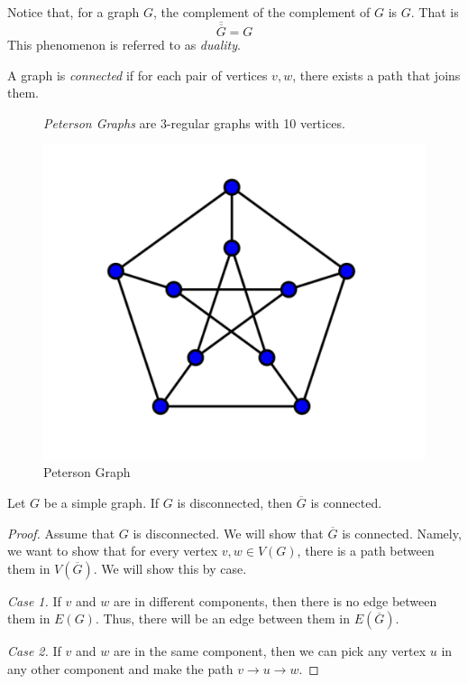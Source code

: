 \begin{remark}[Duality]
  Notice that, for a graph \(G\), the complement of the complement of \(G\) is
  \(G\). That is 
  \[ \overline{\overline{G}} = G \]
  This phenomenon is referred to as \textit{duality}.
\end{remark}

\begin{definition}
  A graph is \textit{connected} if for each pair of vertices \(v, w\), there
  exists a path that joins them.
\end{definition}

\begin{figure}[ht]
\begin{nexample}
    \textit{Peterson Graphs} are \(3\)-regular graphs with 10 vertices.
   
  \begin{center}
    \includegraphics{figures/l01/peterson-graph}
  \end{center}
  \caption{Peterson Graph}\label{fig:l01-peterson-graph}
\end{nexample}
\end{figure}

\begin{theorem}
  Let \(G\) be a simple graph. If \(G\) is disconnected, then \(\overline{G}\) is connected.
\end{theorem}

\begin{proof}
  Assume that \(G\) is disconnected. We will show that \(\overline{G}\) is
  connected. Namely, we want to show that for every vertex \(v, w \in
  V({G})\), there is a path between them in \(V(\overline{G})\). We will show
  this by case.

  \textit{Case 1.} If \(v\) and \(w\) are in different components, then there
  is no edge between them in \(E(G)\). Thus, there will be an edge between them
  in \(E(\overline{G})\).

  \textit{Case 2.} If \(v\) and \(w\) are in the same component, then we can
  pick any vertex \(u\) in any other component and make the path \(v \to u \to
  w\).
\end{proof}

